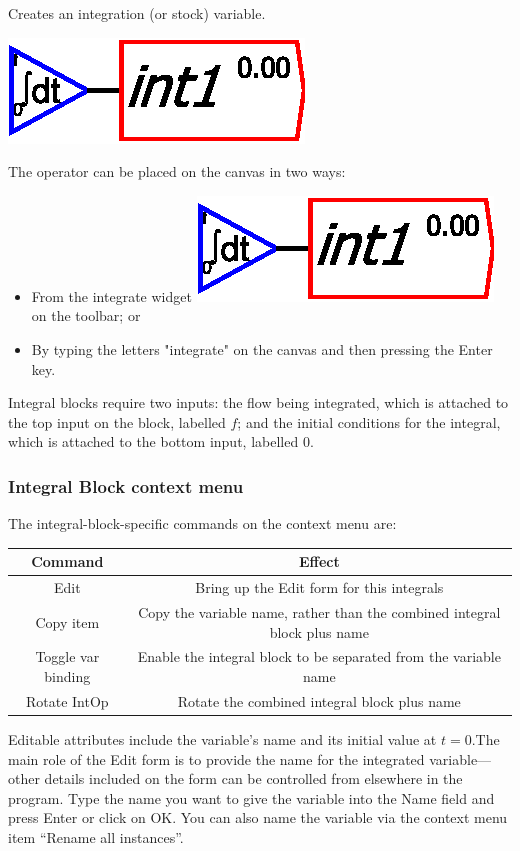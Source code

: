 \label{IntOp} Creates an integration (or stock) variable.

\includegraphics{images/integral}

The operator can be placed on the canvas in two ways:
\begin{itemize}
\item From the integrate widget \includegraphics{images/integral} on the
toolbar; or 
\item By typing the letters "integrate" on the canvas and then pressing
the Enter key.
\end{itemize}
Integral blocks require two inputs: the flow being integrated, which
is attached to the top input on the block, labelled $f$; and the
initial conditions for the integral, which is attached to the bottom
input, labelled $0$.

\subsubsection{Integral Block context menu}

The integral-block-specific commands on the context menu are:

\begin{tabular}{|c|c|}
\hline 
Command & Effect\tabularnewline
\hline 
\hline 
Edit & Bring up the Edit form for this integrals\tabularnewline
\hline 
Copy item & Copy the variable name, rather than the combined integral block plus
name\tabularnewline
\hline 
Toggle var binding & Enable the integral block to be separated from the variable name\tabularnewline
\hline 
Rotate IntOp & Rotate the combined integral block plus name\tabularnewline
\hline 
\end{tabular}

Editable attributes include the variable's name and its initial value
at $t=0$.The main role of the Edit form is to provide the name for
the integrated variable---other details included on the form can
be controlled from elsewhere in the program. Type the name you want
to give the variable into the Name field and press Enter or click
on OK. You can also name the variable via the context menu item ``Rename
all instances''.

